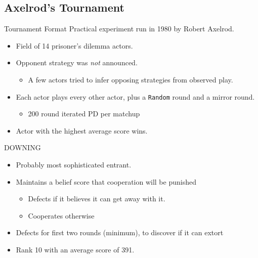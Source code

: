 \documentclass[pdf]{beamer}
\begin{document}
\subsection{Axelrod's Tournament}
\begin{frame}{Tournament Format}
  Practical experiment run in 1980 by Robert Axelrod.

  \begin{itemize}
  \item Field of 14 prisoner's dilemma actors.
  \item Opponent strategy was \emph{not} announced.
    \begin{itemize}
    \item A few actors tried to infer opposing strategies from observed play.
    \end{itemize}
  \item Each actor plays every other actor, plus a \texttt{Random} round and a mirror round.
    \begin{itemize}
    \item 200 round iterated PD per matchup
    \end{itemize}
  \item Actor with the highest average score wins.
  \end{itemize}
\end{frame}

\begin{frame}{DOWNING}
  \begin{itemize}
  \item Probably most sophisticated entrant.
  \pause\item Maintains a belief score that cooperation will be punished
    \begin{itemize}
    \item Defects if it believes it can get away with it.
    \item Cooperates otherwise
    \end{itemize}
  \pause\item Defects for first two rounds (minimum), to discover if it can extort
  \pause\item Rank 10 with an average score of 391.
  \end{itemize}
\end{frame}
\end{document}
